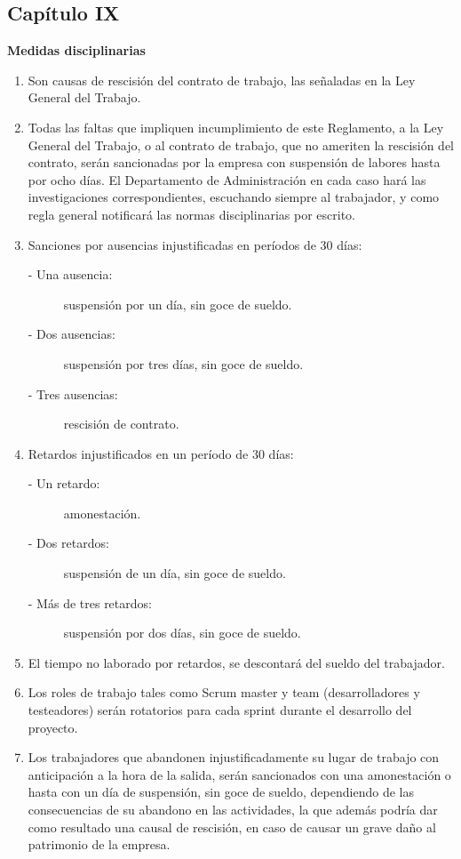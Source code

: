 \documentclass[11pt,letterpaper]{report}
\begin{document}
\subsection{Capítulo IX}
\begin{center}
{\bf Medidas disciplinarias}
\end{center}
\begin{enumerate}
\item Son causas de rescisión del contrato de trabajo, las señaladas en la Ley General del Trabajo.
\item Todas las faltas que impliquen incumplimiento de este Reglamento, a la Ley General del Trabajo, o al contrato de trabajo, que no ameriten la rescisión del contrato, serán sancionadas por la empresa con suspensión de labores hasta por ocho días.
El Departamento de Administración en cada caso hará las investigaciones correspondientes, escuchando siempre al trabajador, y como regla general notificará las normas disciplinarias por escrito.
\item Sanciones por ausencias injustificadas en períodos de 30 días:
\begin{description}
\item[- Una ausencia:] suspensión por un día, sin goce de sueldo.
\item[- Dos ausencias:] suspensión por tres días, sin goce de sueldo.
\item[- Tres ausencias:] rescisión de contrato.
\end{description}
\item Retardos injustificados en un período de 30 días:
\begin{description}
\item[- Un retardo:] amonestación.
\item[- Dos retardos:] suspensión de un día, sin goce de sueldo.
\item[- Más de tres retardos:] suspensión por dos días, sin goce de sueldo.
\end{description}
\item El tiempo no laborado por retardos, se descontará del sueldo del trabajador.
\item Los roles de trabajo tales como Scrum master y team (desarrolladores y testeadores) serán rotatorios para cada sprint durante el desarrollo del proyecto.
\item Los trabajadores que abandonen injustificadamente su lugar de trabajo con anticipación a la hora de la salida, serán sancionados con una amonestación o hasta con un día de suspensión, sin goce de sueldo, dependiendo de las consecuencias de su abandono en las actividades, la que además podría dar como resultado una causal de rescisión, en caso de causar un grave daño al patrimonio de la empresa.

\end{enumerate}
\end{document}
